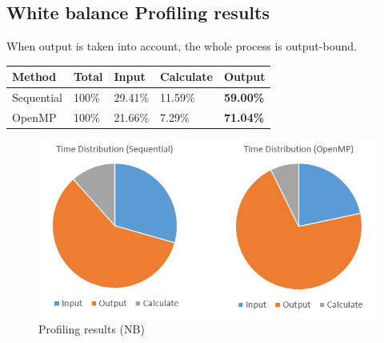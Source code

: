 \documentclass{acm_proc_article-sp}
\begin{document}
\subsection{White balance Profiling results}
When output is taken into account, the whole process is output-bound.
\begin{table}[H]
\centering
\begin{tabular}{|l|l|l|l|l|} \hline
Method&Total&Input&Calculate&Output\\ \hline
Sequential & 100\% & 29.41\% & 11.59\% & \textbf{59.00\%} \\ \hline
OpenMP & 100\% & 21.66\% & 7.29\% & \textbf{71.04\%} \\ \hline
\end{tabular}
\end{table}
\begin{figure}[H]
  \includegraphics[width=\linewidth,natwidth=757,natheight=395]{profile.png}
  \caption{Profiling results (NB)}
  \label{fig:profile}
\end{figure}
\end{document}
